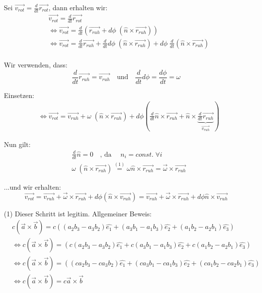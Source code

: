 \documentclass[a4paper,german,12pt,smallheadings]{scrartcl}
\begin{document}
Sei $\vec{v_{rot}}=\frac{d}{dt} \vec{r_{rot}}$, dann erhalten wir:
\begin{align*}
& \vec{v_{rot}}= \frac{d}{dt} \vec{r_{rot}}\\
& \Leftrightarrow \vec{v_{rot}}=\frac{d}{dt} \left(\vec{r_{ruh}}+d\phi \; \left(\hat{n} \times \vec{r_{ruh}}\right)\right)\\
& \Leftrightarrow \vec{v_{rot}}=\frac{d}{dt} \vec{r_{ruh}}+\frac{d}{dt}d\phi \; \left(\hat{n} \times \vec{r_{ruh}}\right)+d\phi \; \frac{d}{dt}\left(\hat{n} \times \vec{r_{ruh}}\right)\\
\end{align*}

Wir verwenden, dass:
\begin{equation*}
\frac{d}{dt} \vec{r_{ruh}}=\vec{v_{ruh}} \quad \text{und} \quad \frac{d}{dt}d\phi=\frac{d\phi}{dt}=\omega
\end{equation*}

Einsetzen:
\begin{align*}
& \Leftrightarrow \vec{v_{rot}}=\vec{v_{ruh}}+\omega \; \left(\hat{n} \times \vec{r_{ruh}}\right)+d\phi\left({\frac{d}{dt}\hat{n}} \times \vec{r_{ruh}}+\hat{n} \times \underbrace{\frac{d}{dt}\vec{r_{ruh}}}_{\vec{v_{ruh}}}\right)
\end{align*}

Nun gilt:
\begin{align*}
& \frac{d}{dt}\hat{n}=0 \quad \text{, da } \quad n_i=const.\; \forall i\\
& \omega \; \left(\hat{n} \times \vec{r_{ruh}}\right)\overset{(1)}{=}\omega\hat{n} \times \vec{r_{ruh}}=\vec{\omega} \times \vec{r_{ruh}}
\end{align*}

...und wir erhalten:
\begin{equation*}
\vec{v_{rot}}=\vec{v_{ruh}}+\vec{\omega} \times \vec{r_{ruh}}+d\phi\left(\hat{n} \times \vec{v_{ruh}}\right)=\vec{v_{ruh}}+\vec{\omega} \times \vec{r_{ruh}}+d\phi\hat{n} \times \vec{v_{ruh}}
\end{equation*}


(1) Dieser Schritt ist legitim. Allgemeiner Beweis:
\begin{align*}
& c\left(\vec{a} \times \vec{b}\right)=c\left(\left(a_2b_3-a_3b_2\right)\hat{e_1}+\left(a_3b_1-a_1b_3\right)\hat{e_2}+\left(a_1b_2-a_2b_1\right)\hat{e_3}\right)\\
& \Leftrightarrow c\left(\vec{a} \times \vec{b}\right)=\left(c \left(a_2b_3-a_3b_2\right)\hat{e_1}+c \left (a_3b_1-a_1b_3\right)\hat{e_2}+c \left(a_1b_2-a_2b_1\right)\hat{e_3}\right)\\
& \Leftrightarrow c\left(\vec{a} \times \vec{b}\right)=\left(\left(ca_2b_3-ca_3b_2\right)\hat{e_1}+\left (ca_3b_1-ca_1b_3\right)\hat{e_2}+\left(ca_1b_2-ca_2b_1\right)\hat{e_3}\right)\\
& \Leftrightarrow c\left(\vec{a} \times \vec{b}\right)=c\vec{a}\times \vec{b}
\end{align*}
\\
\end{document}
